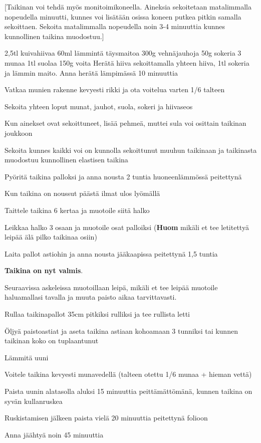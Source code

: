 [Taikinan voi tehdä myös monitoimikoneella. Aineksia sekoitetaan matalimmalla nopeudella minuutti, kunnes voi lisätään osissa koneen putkea pitkin samalla sekoittaen. Sekoita matalimmalla nopeudella noin 3-4 minuuttia kunnes kunnollinen taikina muodostuu.]

\begin{step}
  2,5tl kuivahiivaa
  60ml lämmintä täysmaitoa
  300g vehnäjauhoja
  50g sokeria
  3 munaa
  1tl suolaa
  150g voita
  \method
  Herätä hiiva sekoittamalla yhteen hiiva, 1tl sokeria ja lämmin maito. Anna herätä lämpimässä 10 minuuttia

  Vatkaa munien rakenne kevyesti rikki ja ota voitelua varten 1/6 talteen

  Sekoita yhteen loput munat, jauhot, suola, sokeri ja hiivaseos

  Kun ainekset ovat sekoittuneet, lisää pehmeä, muttei sula voi osittain taikinan joukkoon

  Sekoita kunnes kaikki voi on kunnolla sekoittunut muuhun taikinaan ja taikinasta muodostuu kunnollinen elastisen taikina

  Pyöritä taikina palloksi ja anna nousta 2 tuntia huoneenlämmössä peitettynä

  Kun taikina on noussut päästä ilmat ulos lyömällä

  Taittele taikina 6 kertaa ja muotoile siitä halko

  Leikkaa halko 3 osaan ja muotoile osat palloiksi (\textbf{Huom} mikäli et tee letitettyä leipää älä pilko taikinaa osiin)

  Laita pallot astiohin ja anna nousta jääkaapissa peitettynä 1,5 tuntia

  \textbf{Taikina on nyt valmis}.
\end{step}

Seuraavissa askeleissa muotoillaan leipä, mikäli et tee leipää muotoile haluamallasi tavalla ja muuta paisto aikaa tarvittavasti.


\begin{step}
  \method
  Rullaa taikinapallot 35cm pitkiksi rulliksi ja tee rullista letti

  Öljyä paistoastiat ja aseta taikina astiaan kohoamaan 3 tunniksi tai kunnen taikinan koko on tuplaantunut

  Lämmitä uuni 

  Voitele taikina kevyesti munavedellä (talteen otettu 1/6 munaa + hieman vettä)

  Paista uunin alatasolla aluksi 15 minuuttia peittämättömänä, kunnen taikina on syvän kullanruskea

  Ruskistamisen jälkeen paista vielä 20 minuuttia peitettynä folioon

  Anna jäähtyä noin 45 minuuttia
\end{step}

